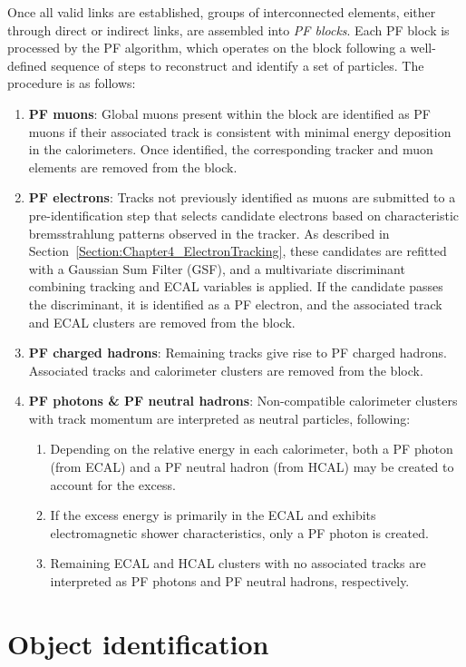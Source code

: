 Once all valid links are established, groups of interconnected elements, either through direct or indirect links, are assembled into \textit{PF blocks}. Each PF block is processed by the PF algorithm, which operates on the block following a well-defined sequence of steps to reconstruct and identify a set of particles. The procedure is as follows:

\begin{enumerate}
    \item \textbf{PF muons}: Global muons present within the block are identified as PF muons if their associated track is consistent with minimal energy deposition in the calorimeters. Once identified, the corresponding tracker and muon elements are removed from the block.
    \item \textbf{PF electrons}: Tracks not previously identified as muons are submitted to a pre-identification step that selects candidate electrons based on characteristic bremsstrahlung patterns observed in the tracker. As described in Section~\ref{Section:Chapter4_ElectronTracking}, these candidates are refitted with a Gaussian Sum Filter (GSF), and a multivariate discriminant combining tracking and ECAL variables is applied. If the candidate passes the discriminant, it is identified as a PF electron, and the associated track and ECAL clusters are removed from the block.
    \item \textbf{PF charged hadrons}: Remaining tracks give rise to PF charged hadrons. Associated tracks and calorimeter clusters are removed from the block.
    \item \textbf{PF photons \& PF neutral hadrons}: Non-compatible calorimeter clusters with track momentum are interpreted as neutral particles, following:
    \begin{enumerate}
        \item Depending on the relative energy in each calorimeter, both a PF photon (from ECAL) and a PF neutral hadron (from HCAL) may be created to account for the excess.
        \item If the excess energy is primarily in the ECAL and exhibits electromagnetic shower characteristics, only a PF photon is created.
        \item Remaining ECAL and HCAL clusters with no associated tracks are interpreted as PF photons and PF neutral hadrons, respectively.
    \end{enumerate}
\end{enumerate}

\section{Object identification}
\label{Section:Chapter4_Object_Identification}

